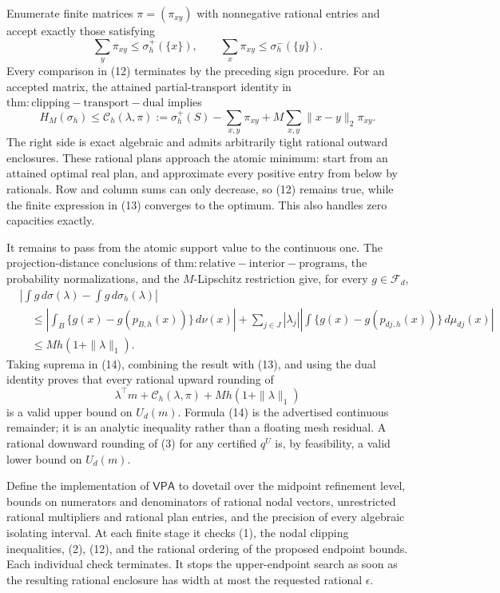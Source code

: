 Enumerate finite matrices \(\pi=(\pi_{xy})\) with nonnegative rational entries
and accept exactly those satisfying
\[
 \sum_y\pi_{xy}\leq\sigma_h^+(\{x\}),
 \qquad
 \sum_x\pi_{xy}\leq\sigma_h^-(\{y\}).                     \tag{12}
\]
Every comparison in (12) terminates by the preceding sign procedure.  For an
accepted matrix, the attained partial-transport identity in
\(\mathrm{thm:clipping-transport-dual}\) implies
\[
 H_M(\sigma_h)
 \leq \mathcal C_h(\lambda,\pi)
 :=\sigma_h^+(S)-\sum_{x,y}\pi_{xy}
      +M\sum_{x,y}\|x-y\|_2\pi_{xy}.                       \tag{13}
\]
The right side is exact algebraic and admits arbitrarily tight rational outward
enclosures.  These rational plans approach the atomic minimum: start from an
attained optimal real plan, and approximate every positive entry from below by
rationals.  Row and column sums can only decrease, so (12) remains true, while
the finite expression in (13) converges to the optimum.  This also handles
zero capacities exactly.

It remains to pass from the atomic support value to the continuous one.  The
projection-distance conclusions of \(\mathrm{thm:relative-interior-programs}\),
the probability normalizations, and the \(M\)-Lipschitz restriction give, for
every \(g\in\mathcal F_d\),
\begin{align}
 &\left|\int g\,d\sigma(\lambda)-
             \int g\,d\sigma_h(\lambda)\right| \\
 &\quad\leq
 \left|\int_B\{g(x)-g(p_{B,h}(x))\}\,d\nu(x)\right|
 +\sum_{j\in J}|\lambda_j|
   \left|\int\{g(x)-g(p_{dj,h}(x))\}\,d\mu_{dj}(x)\right| \\
 &\quad\leq Mh(1+\|\lambda\|_1).                           \tag{14}
\end{align}
Taking suprema in (14), combining the result with (13), and using the dual
identity proves that every rational upward rounding of
\[
 \lambda^\top m+\mathcal C_h(\lambda,\pi)
       +Mh(1+\|\lambda\|_1)                                \tag{15}
\]
is a valid upper bound on \(U_d(m)\).  Formula (14) is the advertised
continuous remainder; it is an analytic inequality rather than a floating
mesh residual.  A rational downward rounding of (3) for any certified
\(q^U\) is, by feasibility, a valid lower bound on \(U_d(m)\).

Define the implementation of \(\mathsf{VPA}\) to dovetail over the midpoint
refinement level, bounds on numerators and denominators of rational nodal
vectors, unrestricted rational multipliers and rational plan entries, and the
precision of every algebraic isolating interval.  At each finite stage it
checks (1), the nodal clipping inequalities, (2), (12), and the rational
ordering of the proposed endpoint bounds.  Each individual check terminates.
It stops the upper-endpoint search as soon as the resulting rational enclosure
has width at most the requested rational \(\epsilon\).

